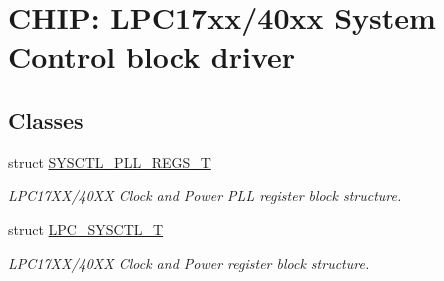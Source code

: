 \hypertarget{group___s_y_s_c_t_l__17_x_x__40_x_x}{\section{C\+H\+I\+P\+: L\+P\+C17xx/40xx System Control block driver}
\label{group___s_y_s_c_t_l__17_x_x__40_x_x}
}
\subsection*{Classes}
\begin{DoxyCompactItemize}
\item 
struct \hyperlink{struct_s_y_s_c_t_l___p_l_l___r_e_g_s___t}{S\+Y\+S\+C\+T\+L\+\_\+\+P\+L\+L\+\_\+\+R\+E\+G\+S\+\_\+\+T}
\begin{DoxyCompactList}\small\item\em L\+P\+C17\+X\+X/40\+X\+X Clock and Power P\+L\+L register block structure. \end{DoxyCompactList}\item 
struct \hyperlink{struct_l_p_c___s_y_s_c_t_l___t}{L\+P\+C\+\_\+\+S\+Y\+S\+C\+T\+L\+\_\+\+T}
\begin{DoxyCompactList}\small\item\em L\+P\+C17\+X\+X/40\+X\+X Clock and Power register block structure. \end{DoxyCompactList}\end{DoxyCompactItemize}
